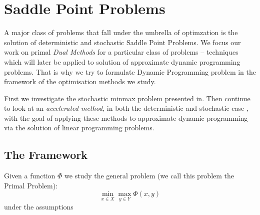 \documentclass[12pt,reqno]{amsart}
\numberwithin{equation}{section}
\begin{document}
\section{Saddle Point Problems}

A major class of problems that fall under the umbrella of optimzation is the solution of deterministic and stochastic Saddle Point Problems. We focus our work on primal \emph{Dual Methods} for a particular class of problems -- techniques which will later be applied to solution of approximate dynamic programming problems.
That is why we try to formulate Dynamic Programming problem in the framework of the optimisation methods we study.

First we investigate the stochastic minmax problem presented in\cite{NemirovskiRubinstein}. Then continue to look at an \emph{accelerated method}, in both the deterministic \cite{ChambollePock} and stochastic case \cite{ChenLanOuyang}, with the goal of applying these methods to approximate dynamic programming via the solution of linear programming problems.

\subsection{The Framework}

Given a function $\Phi$ we study the general problem (we call this problem the Primal Problem):
$$
\min_{x \in X}\max_{y \in Y} \Phi(x,y)
$$
under the assumptions
\end{document}
